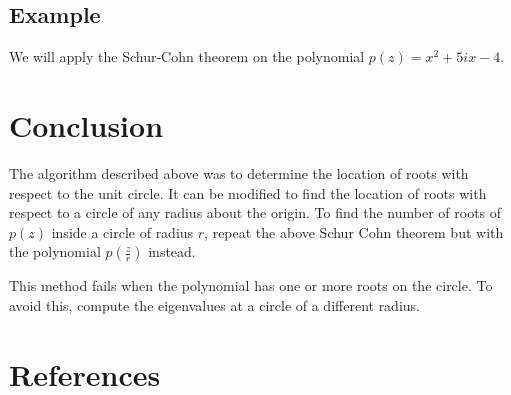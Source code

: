 \documentclass[twofold]{article}
\theoremstyle{plain}
\theoremstyle{definition}
\theoremstyle{remark}
\begin{document}
\subsection{Example}

We will apply the Schur-Cohn theorem on the polynomial \(p(z) = x^2 + 5i x - 4\). 


\section{Conclusion}

The algorithm described above was to determine the location of roots with respect to the unit circle. It can be modified to find the location of roots with respect to a circle of any radius about the origin. To find the number of roots of \(p(z)\) inside a circle of radius \(r\), repeat the above Schur Cohn theorem but with the polynomial \(p(\frac{z}{r})\) instead. 

This method fails when the polynomial has one or more roots on the circle. To avoid this, compute the eigenvalues at a circle of a different radius. 

\section{References}
\end{document}
